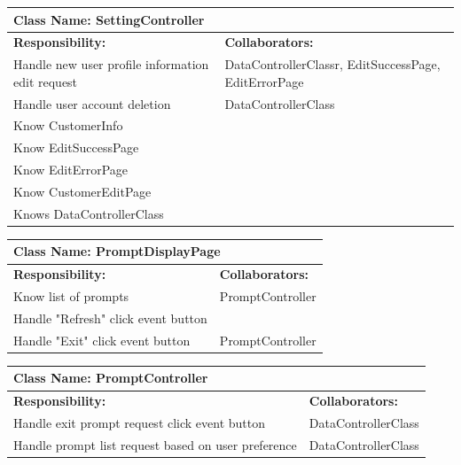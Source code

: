 \documentclass[]{article}
\begin{document}
	\begin{table}[H]
	\centering
	\begin{tabular}{|p{6cm}|p{6cm}|}
	\hline 
		\multicolumn{2}{|l|}{\textbf{Class Name: SettingController}} \\
	\hline
	\textbf{Responsibility:} & \textbf{Collaborators:} \\
	\hline
	Handle new user profile information edit request & DataControllerClassr, EditSuccessPage, EditErrorPage\\ \hline
	Handle user account deletion & DataControllerClass\\ \hline
	Know CustomerInfo & \\ \hline 
	Know EditSuccessPage & \\ \hline 
	Know EditErrorPage & \\ \hline
	Know CustomerEditPage & \\ \hline
	Knows DataControllerClass& \\ \hline
	\end{tabular}
	\end{table}
	
	\begin{table}[H]
	\centering
	\begin{tabular}{|p{6cm}|p{6cm}|}
	\hline 
		\multicolumn{2}{|l|}{\textbf{Class Name: PromptDisplayPage}} \\
	\hline
	\textbf{Responsibility:} & \textbf{Collaborators:} \\
	\hline
	Know list of prompts & PromptController\\ \hline
	Handle "Refresh" click event button & \\ \hline
	Handle "Exit" click event button & PromptController \\ \hline
	\end{tabular}
	\end{table}
	
	\begin{table}[H]
	\centering
	\begin{tabular}{|p{6cm}|p{6cm}|}
	\hline 
		\multicolumn{2}{|l|}{\textbf{Class Name: PromptController}} \\
	\hline
	\textbf{Responsibility:} & \textbf{Collaborators:} \\
	\hline
	Handle exit prompt request click event button & DataControllerClass\\ \hline
	Handle prompt list request based on user preference & DataControllerClass\\ \hline
	\end{tabular}
	\end{table}
	
\end{document}
